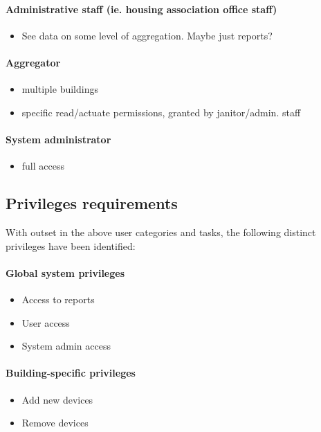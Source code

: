\paragraph{Administrative staff (ie. housing association office staff)}
\begin{itemize}
    \item{See data on some level of aggregation. Maybe just reports?}
\end{itemize}

\paragraph{Aggregator}
\begin{itemize}
    \item{multiple buildings}
    \item{specific read/actuate permissions, granted by janitor/admin. staff}
\end{itemize}

\paragraph{System administrator}
\begin{itemize}
    \item{full access}
\end{itemize}

\newpage
\subsection{Privileges requirements} \label{subsection:PrivilegesRequirements}
With outset in the above user categories and tasks, the following distinct privileges have been identified:

\paragraph{Global system privileges}
\begin{itemize}
    \item{Access to reports}
    \item{User access}
    \item{System admin access}
\end{itemize}

\paragraph{Building-specific privileges}
\begin{itemize}
    \item{Add new devices}
    \item{Remove devices}
\end{itemize}

